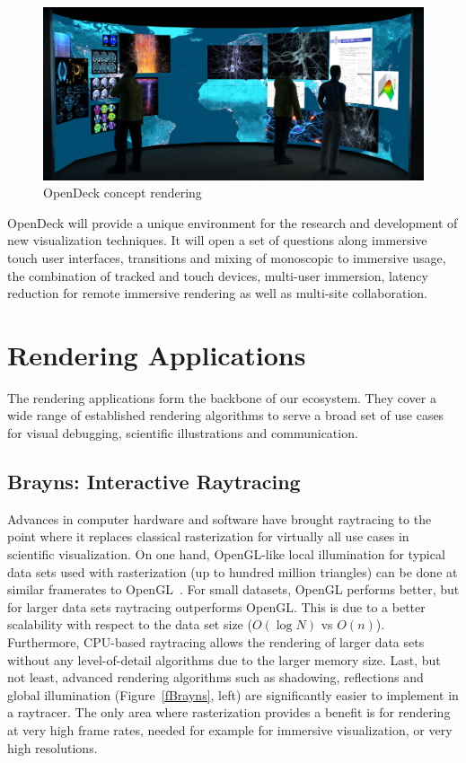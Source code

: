 \documentclass[10pt]{llncs}
\newcommand{\fig}[1]{Figure~\ref{#1}}
\begin{document}
\begin{figure}[h!t]
  \includegraphics[width=\columnwidth]{images/opendeck}
  \caption{\label{fOpenDeck}OpenDeck concept rendering}
\end{figure}

OpenDeck will provide a unique environment for the research and development of
new visualization techniques. It will open a set of questions along immersive
touch user interfaces, transitions and mixing of monoscopic to immersive usage,
the combination of tracked and touch devices, multi-user immersion, latency
reduction for remote immersive rendering as well as multi-site collaboration.

\section{Rendering Applications}

The rendering applications form the backbone of our ecosystem. They cover a
wide range of established rendering algorithms to serve a broad set of use
cases for visual debugging, scientific illustrations and communication.

\subsection{Brayns: Interactive Raytracing}

Advances in computer hardware and software have brought raytracing to the point
where it replaces classical rasterization for virtually all use cases in
scientific visualization. On one hand, OpenGL-like local illumination for
typical data sets used with rasterization (up to hundred million triangles) can
be done at similar framerates to OpenGL~\cite{ospray}. For small datasets,
OpenGL performs better, but for larger data sets raytracing outperforms OpenGL.
This is due to a better scalability with respect to the data set size
($O(\log{N})$ vs $O(n)$). Furthermore, CPU-based raytracing allows the rendering
of larger data sets without any level-of-detail algorithms due to the larger
memory size. Last, but not least, advanced rendering algorithms such as
shadowing, reflections and global illumination (\fig{fBrayns}, left) are
significantly easier to implement in a raytracer. The only area where
rasterization provides a benefit is for rendering at very high frame rates,
needed for example for immersive visualization, or very high resolutions.
\end{document}
